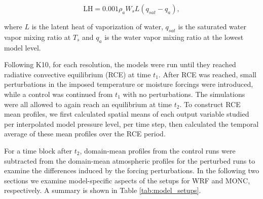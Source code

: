 \documentclass[draft]{agujournal2019}
\begin{document}
\begin{equation}
\textrm{LH} = 0.001 \rho_a W_s L (q_{sat} - q_a),
\label{eq:LH}
\end{equation}

\noindent where $L$ is the latent heat of vaporization of water, $q_{sat}$ is
the saturated water vapor mixing ratio at $T_s$ and $q_a$ is the water vapor
mixing ratio at the lowest model level. 

Following K10, for each resolution, the models were run until they reached
radiative convective equilibrium (RCE) at time $t_1$. After RCE was reached,
small perturbations in the imposed temperature or moisture forcings were
introduced, while a control was continued from $t_1$ with no perturbations. The
simulations were all allowed to again reach an equilibrium at time $t_2$. To
construct RCE mean profiles, we first calculated spatial means of each output
variable studied per interpolated model pressure level, per time step, then
calculated the temporal average of these mean profiles over the RCE period.

For a time block after $t_2$, domain-mean profiles from the control runs were
subtracted from the domain-mean atmospheric profiles for the perturbed runs to
examine the differences induced by the forcing perturbations. In the following
two sections we examine model-specific aspects of the setups for WRF and MONC,
respectively. A summary is shown in Table \ref{tab:model_setups}.
\end{document}
